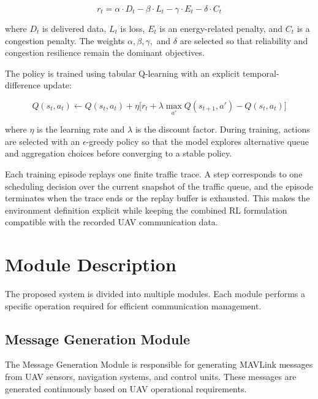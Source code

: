 \begin{equation}
r_t = \alpha \cdot D_t - \beta \cdot L_t - \gamma \cdot E_t - \delta \cdot C_t
\end{equation}

\noindent where $D_t$ is delivered data, $L_t$ is loss, $E_t$ is an 
energy-related penalty, and $C_t$ is a congestion penalty. The weights 
$\alpha, \beta, \gamma,$ and $\delta$ are selected so that reliability 
and congestion resilience remain the dominant objectives.

The policy is trained using tabular Q-learning with an explicit temporal-
difference update:

\begin{equation}
Q(s_t,a_t) \leftarrow Q(s_t,a_t) + \eta \big[r_t + \lambda \max_{a'} Q(s_{t+1},a') - Q(s_t,a_t)\big]
\label{eq:q_learning_update}
\end{equation}

\noindent where $\eta$ is the learning rate and $\lambda$ is the discount
factor. During training, actions are selected with an $\epsilon$-greedy
policy so that the model explores alternative queue and aggregation choices
before converging to a stable policy.

Each training episode replays one finite traffic trace. A step corresponds to
one scheduling decision over the current snapshot of the traffic queue, and
the episode terminates when the trace ends or the replay buffer is exhausted.
This makes the environment definition explicit while keeping the combined
RL formulation compatible with the recorded UAV communication data.


\section{Module Description}

The proposed system is divided into multiple modules. Each module 
performs a specific operation required for efficient communication 
management.


\subsection{Message Generation Module}

The Message Generation Module is responsible for generating MAVLink 
messages from UAV sensors, navigation systems, and control units. 
These messages are generated continuously based on UAV operational 
requirements.

